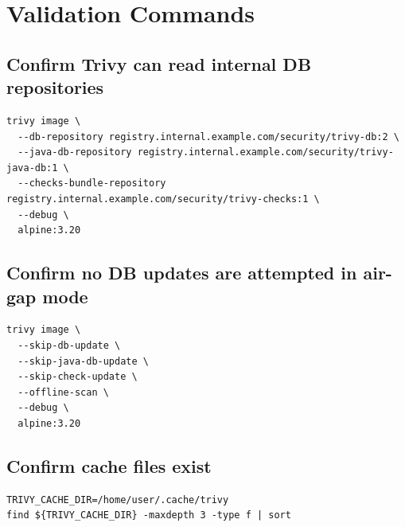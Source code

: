 \documentclass[10pt]{article}
\begin{document}
\section{Validation Commands}
\subsection{Confirm Trivy can read internal DB repositories}
\begin{verbatim}
trivy image \
  --db-repository registry.internal.example.com/security/trivy-db:2 \
  --java-db-repository registry.internal.example.com/security/trivy-java-db:1 \
  --checks-bundle-repository registry.internal.example.com/security/trivy-checks:1 \
  --debug \
  alpine:3.20
\end{verbatim}

\subsection{Confirm no DB updates are attempted in air-gap mode}
\begin{verbatim}
trivy image \
  --skip-db-update \
  --skip-java-db-update \
  --skip-check-update \
  --offline-scan \
  --debug \
  alpine:3.20
\end{verbatim}

\subsection{Confirm cache files exist}
\begin{verbatim}
TRIVY_CACHE_DIR=/home/user/.cache/trivy
find ${TRIVY_CACHE_DIR} -maxdepth 3 -type f | sort
\end{verbatim}
\end{document}

